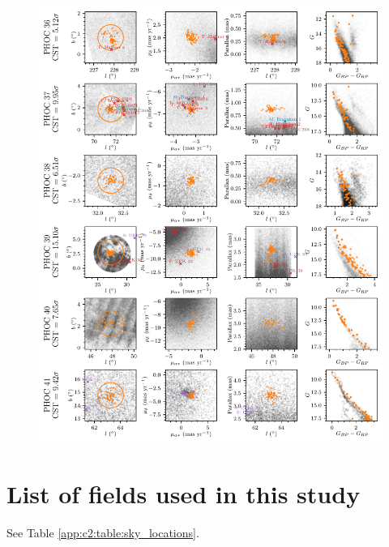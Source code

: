 \begin{figure}[ht]
   \centering
   \includegraphics[width=\textwidth]{fig/c2/fig_new_ocs_6.pdf}
   \caption[Plots of the new OCs PHOC 36 to 41]{}%
   \label{app:c2:fig:new_ocs_6}
\end{figure}






\section{List of fields used in this study}\label{app:c2:fields}

See Table \ref{app:c2:table:sky_locations}.


